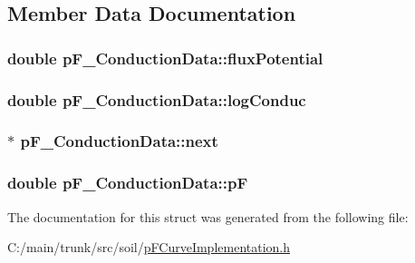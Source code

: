 \subsection{Member Data Documentation}
\hypertarget{structp_f___conduction_data_ac4bf15ddcbe2b9c623cc61f2f36b14d2}{
\subsubsection[{fluxPotential}]{\setlength{\rightskip}{0pt plus 5cm}double {\bf pF\_\-ConductionData::fluxPotential}}}
\label{structp_f___conduction_data_ac4bf15ddcbe2b9c623cc61f2f36b14d2}
\hypertarget{structp_f___conduction_data_a1fbf6af77ca62f85f0d82876b38f3e46}{
\subsubsection[{logConduc}]{\setlength{\rightskip}{0pt plus 5cm}double {\bf pF\_\-ConductionData::logConduc}}}
\label{structp_f___conduction_data_a1fbf6af77ca62f85f0d82876b38f3e46}
\hypertarget{structp_f___conduction_data_aac9d0907d010665bf4718ed10280f435}{
\subsubsection[{next}]{$\ast$ {\bf pF\_\-ConductionData::next}}}
\label{structp_f___conduction_data_aac9d0907d010665bf4718ed10280f435}
\hypertarget{structp_f___conduction_data_a34d456198c3ee6c21d1b942f2da190ea}{
\subsubsection[{pF}]{\setlength{\rightskip}{0pt plus 5cm}double {\bf pF\_\-ConductionData::pF}}}
\label{structp_f___conduction_data_a34d456198c3ee6c21d1b942f2da190ea}


The documentation for this struct was generated from the following file:\begin{DoxyCompactItemize}
\item 
C:/main/trunk/src/soil/\hyperlink{p_f_curve_implementation_8h}{pFCurveImplementation.h}\end{DoxyCompactItemize}
